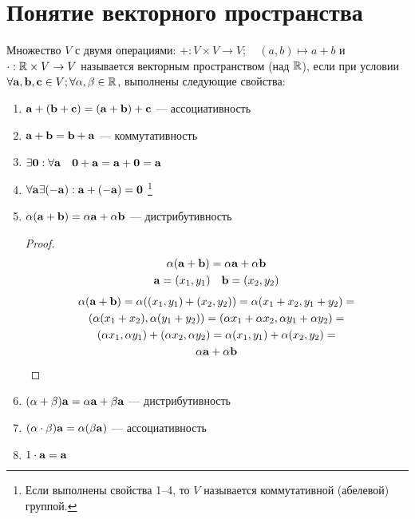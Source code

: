 \documentclass[main]{subfiles}
\begin{document}
\chapter{Понятие векторного пространства}
\begin{definition}
    Множество $V$ с двумя операциями:
    $+:V\times V \to V; \quad (a,b) \mapsto a+b$ и
    $\cdot : \mathbb{R} \times V \to V$ называется векторным пространством (над $\mathbb{R}$),
    если при условии $\forall \mathbf{a}, \mathbf{b}, \mathbf{c} \in V; \forall \alpha, \beta \in \mathbb{R}$, выполнены следующие свойства:

    \begin{enumerate}
        \item $\mathbf{a}+(\mathbf{b}+\mathbf{c}) = (\mathbf{a}+\mathbf{b})+\mathbf{c}$ --- ассоциативность
        \item $\mathbf{a}+\mathbf{b}=\mathbf{b}+\mathbf{a}$ --- коммутативность
        \item $\exists \mathbf{0}:\forall \mathbf{a} \quad \mathbf{0}+\mathbf{a}=\mathbf{a}+\mathbf{0}=\mathbf{a}$
        \item $\forall \mathbf{a} \exists (-\mathbf{a}): \mathbf{a}+(-\mathbf{a})=\mathbf{0}$%
              \footnote{Если выполнены свойства 1--4, то $V$ называется коммутативной (абелевой) группой.}
        \item $\alpha(\mathbf{a}+\mathbf{b})=\alpha \mathbf{a} + \alpha \mathbf{b}$ --- дистрибутивность \begin{proof}
                  \begin{gather*}
                      \alpha (\mathbf{a}+\mathbf{b}) = \alpha \mathbf{a} + \alpha \mathbf{b} \\
                      \mathbf{a} = (x_1, y_1) \quad \mathbf{b} = (x_2, y_2)
                  \end{gather*}
                  \begin{multline*}
                      \alpha(\mathbf{a}+\mathbf{b})=\alpha((x_1, y_1)+(x_2, y_2)) = \alpha (x_1+x_2, y_1+y_2)=\\
                      (\alpha(x_1+x_2), \alpha(y_1+y_2))=(\alpha x_1 + \alpha x_2, \alpha y_1 + \alpha y_2)=\\
                      (\alpha x_1, \alpha y_1)+(\alpha x_2, \alpha y_2) = \alpha (x_1, y_1) + \alpha (x_2, y_2)= \\
                      \alpha \mathbf{a} + \alpha \mathbf{b}
                  \end{multline*}
              \end{proof}
        \item $(\alpha+\beta)\mathbf{a} = \alpha \mathbf{a} + \beta \mathbf{a}$ --- дистрибутивность
        \item $(\alpha \cdot \beta)\mathbf{a} = \alpha(\beta \mathbf{a})$ --- ассоциативность
        \item $1\cdot \mathbf{a} = \mathbf{a}$
    \end{enumerate}
\end{definition}
\end{document}
